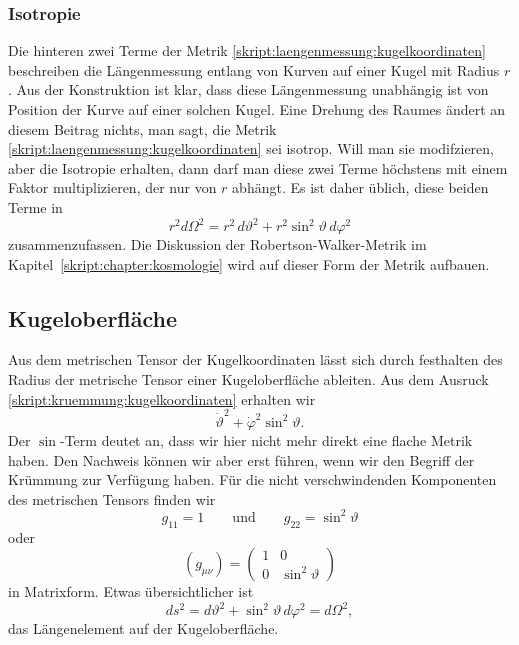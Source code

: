 \subsubsection{Isotropie%
\label{skript:laengenmessung:section:isotropie}}
%
Die hinteren zwei Terme der Metrik
\eqref{skript:laengenmessung:kugelkoordinaten}
beschreiben die Längenmessung entlang von Kurven auf einer Kugel mit Radius $r$.
Aus der Konstruktion ist klar, dass diese Längenmessung unabhängig ist
von Position der Kurve auf einer solchen Kugel.
Eine Drehung des Raumes ändert an diesem Beitrag nichts, man sagt, die
Metrik \eqref{skript:laengenmessung:kugelkoordinaten} sei isotrop.
%
Will man sie modifzieren, aber die Isotropie erhalten, dann darf man
diese zwei Terme höchstens mit einem Faktor multiplizieren, der nur von $r$
abhängt.
Es ist daher üblich, diese beiden Terme in
\begin{equation}
r^2 d\Omega^2
=
r^2\,d\vartheta^2 + r^2\sin^2\vartheta\,d\varphi^2
\label{skript:laengenmessung:omega2}
\end{equation}
zusammenzufassen.
Die Diskussion der Robertson-Walker-Metrik im
Kapitel~\ref{skript:chapter:kosmologie} wird auf dieser Form der Metrik
aufbauen.

\subsection{Kugeloberfläche}
Aus dem metrischen Tensor der Kugelkoordinaten lässt sich durch festhalten
des Radius der metrische Tensor einer Kugeloberfläche ableiten.
Aus dem Ausruck \eqref{skript:kruemmung:kugelkoordinaten}
erhalten wir
\[
\dot\vartheta^2+\dot\varphi^2\sin^2\vartheta.
\]
Der $\sin$-Term deutet an, dass wir hier nicht mehr direkt eine flache
Metrik haben.
Den Nachweis können wir aber erst führen, wenn wir den Begriff der
Krümmung zur Verfügung haben.
Für die nicht verschwindenden Komponenten des metrischen Tensors
finden wir
\[
g_{11} = 1
\qquad\text{und}\qquad
g_{22}=\sin^2\vartheta
\]
oder
\[
(g_{\mu\nu})
=
\begin{pmatrix}
1&0\\
0&\sin^2\vartheta
\end{pmatrix}
\]
in Matrixform.
Etwas übersichtlicher ist 
\begin{equation}
ds^2
=
d\vartheta^2 + \sin^2\vartheta\,d\varphi^2
=
d\Omega^2,
\label{skript:laengenmessung:kugeloberflaeche}
\end{equation}
das Längenelement auf der Kugeloberfläche.
%

